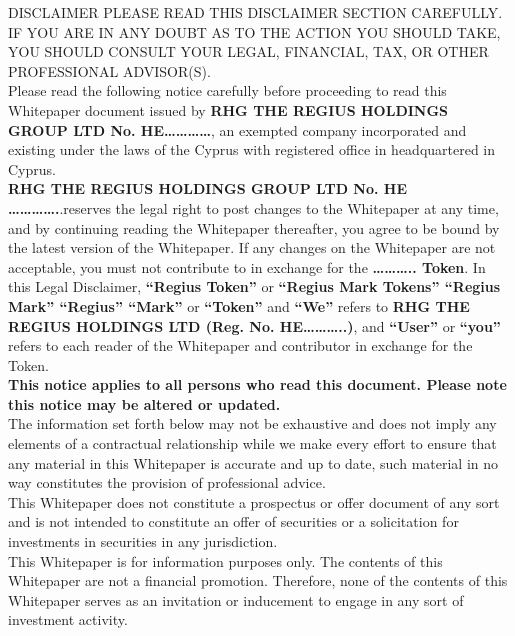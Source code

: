 \documentclass[12pt,a4paper]{article}
\begin{document}
  DISCLAIMER PLEASE READ THIS DISCLAIMER SECTION CAREFULLY. IF YOU ARE IN ANY
  DOUBT AS TO THE ACTION YOU SHOULD TAKE, YOU SHOULD CONSULT YOUR LEGAL,
  FINANCIAL, TAX, OR OTHER PROFESSIONAL ADVISOR(S).\\ %

  Please read the following notice carefully before proceeding to read this
  Whitepaper document issued by \textbf{RHG THE REGIUS HOLDINGS GROUP LTD No.
  HE…………}, an exempted company incorporated and existing under the laws of the
  Cyprus with registered office in headquartered in Cyprus.\\

  \textbf{RHG THE REGIUS HOLDINGS GROUP LTD No. HE ………….}.reserves the legal
  right to post changes to the Whitepaper at any time, and by continuing reading
  the Whitepaper thereafter, you agree to be bound by the latest version of the
  Whitepaper. If any changes on the Whitepaper are not acceptable, you must not
  contribute to in exchange for the \textbf{……….. Token}. In this Legal
  Disclaimer, \textbf{``Regius Token''} or \textbf{``Regius Mark Tokens''
  ``Regius Mark'' ``Regius'' ``Mark''} or \textbf{``Token''} and \textbf{``We''}
  refers to \textbf{RHG THE REGIUS HOLDINGS LTD (Reg. No. HE………..)}, and
  \textbf{``User''} or \textbf{``you''} refers to each reader of the Whitepaper
  and contributor in exchange for the Token.\\

  \textbf{This notice applies to all persons who read this document. Please note
  this notice may be altered or updated.}\\

  The information set forth below may not be exhaustive and does not imply any
  elements of a contractual relationship while we make every effort to ensure
  that any material in this Whitepaper is accurate and up to date, such material
  in no way constitutes the provision of professional advice.\\

  This Whitepaper does not constitute a prospectus or offer document of any sort
  and is not intended to constitute an offer of securities or a solicitation for
  investments in securities in any jurisdiction.\\

  This Whitepaper is for information purposes only. The contents of this
  Whitepaper are not a financial promotion. Therefore, none of the contents of
  this Whitepaper serves as an invitation or inducement to engage in any sort of
  investment activity.\\
\end{document}

